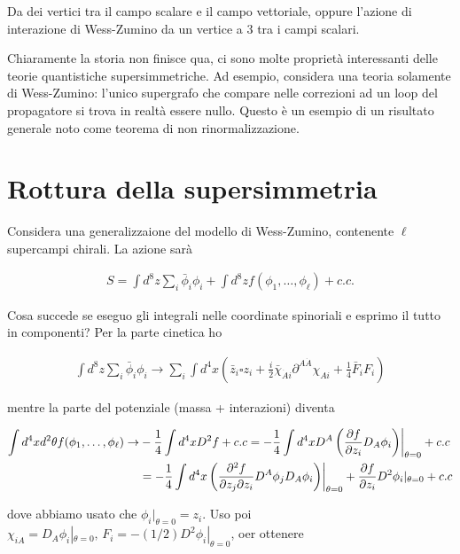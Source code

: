 \documentclass{report}
\begin{document}
Da dei vertici tra il campo scalare e il campo vettoriale, oppure l'azione di interazione di Wess-Zumino da un vertice a 3 tra i campi scalari. 

Chiaramente la storia non finisce qua, ci sono molte proprietà interessanti delle teorie quantistiche supersimmetriche. Ad esempio, considera una teoria solamente di Wess-Zumino: l'unico supergrafo che compare nelle correzioni ad un loop del propagatore si trova in realtà essere nullo. Questo è un esempio di un risultato generale noto come teorema di non rinormalizzazione. 

\section{Rottura della supersimmetria}

Considera una generalizzaione del modello di Wess-Zumino, contenente \(\ell\) supercampi chirali. La azione sarà 

\begin{align}
    S = \int d^8z \sum_i \bar{\phi}_i \phi_i + \int d^8z f(\phi_1, \ldots, \phi_\ell) + c.c.
\end{align}

Cosa succede se eseguo gli integrali nelle coordinate spinoriali e esprimo il tutto in componenti? Per la parte cinetica ho

\begin{align}
    \int d^8z \sum_i \bar{\phi}_i \phi_i \to \sum_i \int d^4x \left(\bar{z}_i \square z_i + \frac{i}{2}\bar{\chi}_{\dot{A}i}\partial^{A\dot{A}}\chi_{Ai} + \frac{1}{4}\bar{F}_i F_i\right)
\end{align}

mentre la parte del potenziale (massa + interazioni) diventa 

\begin{align}
    \int d^4x d^2\theta f(\phi_1, \ldots, \phi_\ell) \to &-\frac{1}{4}\int d^4x D^2 f + c.c = -\frac{1}{4}\int d^4x D^A \left(\frac{\partial f}{\partial z_i}D_A \phi_i \right)\biggr|_{\theta =0} + c.c \notag \\
    &= -\frac{1}{4}\int d^4x \left(\frac{\partial^2f}{\partial z_j \partial z_i} D^A \phi_j D_A \phi_i \right)\biggr|_{\theta =0} + \frac{\partial f}{\partial z_i}D^2\phi_i |_{\theta =0} + c.c
\end{align}

dove abbiamo usato che \(\phi_i |_{\theta =0} = z_i\). Uso poi \(\chi_{iA} = D_A \phi_i |_{\theta =0}, \, F_i = -(1/2)D^2\phi_i |_{\theta = 0}\), oer ottenere 
\end{document}
